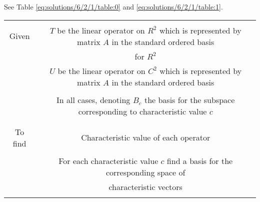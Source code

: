 See Table \ref{eq:solutions/6/2/1/table:0} and \ref{eq:solutions/6/2/1/table:1}.


\begin{table*}[ht!]
\begin{center}
\begin{tabular}{|c|c|}
\hline
& \\
Given & $T$ be the linear operator on $R^2$ which is represented by matrix $A$ in the standard ordered basis\\
& for $R^2$\\
& $U$ be the linear operator on $C^2$ which is represented by matrix $A$ in the standard ordered basis\\
&\\
& In all cases, denoting $B_c$ the basis for the subspace corresponding to characteristic value $c$ \\
& \\
\hline
& \\
To find & Characteristic value of each operator\\
& \\
& For each characteristic value $c$ find a basis for the corresponding space of\\
& characteristic vectors \\
& \\
\hline
\end{tabular}
\end{center}
\caption{}
\label{eq:solutions/6/2/1/table:0}
\end{table*}
